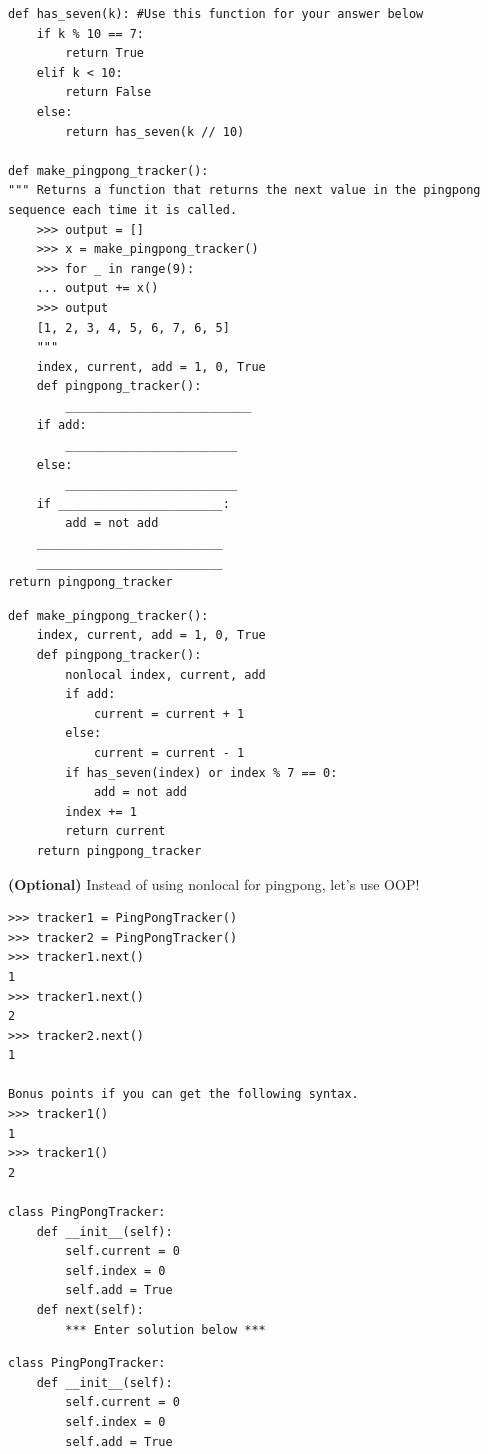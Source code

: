 \documentclass{exam}
\begin{document}
\begin{questions}
\begin{blocksection}
\begin{lstlisting}
def has_seven(k): #Use this function for your answer below
    if k % 10 == 7:
        return True
    elif k < 10:
        return False
    else:
        return has_seven(k // 10)

def make_pingpong_tracker():
""" Returns a function that returns the next value in the pingpong sequence each time it is called. 
	>>> output = []
	>>> x = make_pingpong_tracker()
	>>> for _ in range(9):
	...	output += x()
	>>> output
	[1, 2, 3, 4, 5, 6, 7, 6, 5]
	"""
	index, current, add = 1, 0, True
	def pingpong_tracker():
		__________________________
	if add:
		________________________
	else:
		________________________
	if _______________________:
		add = not add
	__________________________
	__________________________	
return pingpong_tracker

\end{lstlisting}

\begin{solution}
\begin{lstlisting}
def make_pingpong_tracker():
	index, current, add = 1, 0, True
	def pingpong_tracker():
		nonlocal index, current, add
		if add:
			current = current + 1
		else:
			current = current - 1
		if has_seven(index) or index % 7 == 0:
			add = not add
		index += 1
		return current
	return pingpong_tracker
\end{lstlisting}
\end{solution}

\end{blocksection}

\begin{blocksection}
\question \textbf{(Optional)} Instead of using nonlocal for pingpong, let's use OOP!

\begin{lstlisting}
>>> tracker1 = PingPongTracker()
>>> tracker2 = PingPongTracker()
>>> tracker1.next()
1
>>> tracker1.next()
2
>>> tracker2.next()
1

Bonus points if you can get the following syntax.
>>> tracker1()
1
>>> tracker1()
2

class PingPongTracker:
    def __init__(self):
        self.current = 0
        self.index = 0
        self.add = True
    def next(self):
        *** Enter solution below ***
\end{lstlisting}

\begin{solution}[0.3in]
\begin{lstlisting}
class PingPongTracker:
	def __init__(self):
		self.current = 0
		self.index = 0
		self.add = True
	

\end{lstlisting}
\end{solution}
\end{blocksection}
\end{questions}
\end{document}

